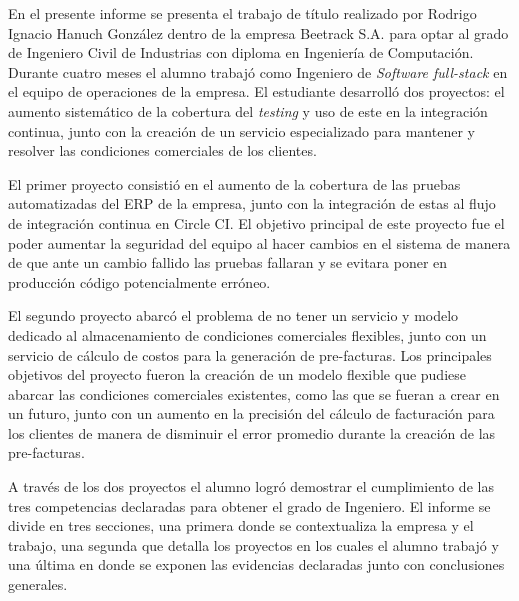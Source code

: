 En el presente informe se presenta el trabajo de título realizado por Rodrigo Ignacio Hanuch González dentro de la empresa Beetrack S.A. para optar al grado de Ingeniero Civil de Industrias con diploma en Ingeniería de Computación. Durante cuatro meses el alumno trabajó como Ingeniero de \textit{Software full-stack} en el equipo de operaciones de la empresa. El estudiante desarrolló dos proyectos: el aumento sistemático de la cobertura del \textit{testing} y uso de este en la integración continua, junto con la creación de un servicio especializado para mantener y resolver las condiciones comerciales de los clientes.

El primer proyecto consistió en el aumento de la cobertura de las pruebas automatizadas del ERP de la empresa, junto con la integración de estas al flujo de integración continua en Circle CI. El objetivo principal de este proyecto fue el poder aumentar la seguridad del equipo al hacer cambios en el sistema de manera de que ante un cambio fallido las pruebas fallaran y se evitara poner en producción código potencialmente erróneo.

El segundo proyecto abarcó el problema de no tener un servicio y modelo dedicado al almacenamiento de condiciones comerciales flexibles, junto con un servicio de cálculo de costos para la generación de pre-facturas. Los principales objetivos del proyecto fueron la creación de un modelo flexible que pudiese abarcar las condiciones comerciales existentes, como las que se fueran a crear en un futuro, junto con un aumento en la precisión del cálculo de facturación para los clientes de manera de disminuir el error promedio durante la creación de las pre-facturas.

A través de los dos proyectos el alumno logró demostrar el cumplimiento de las tres competencias declaradas para obtener el grado de Ingeniero. El informe se divide en tres secciones, una primera donde se contextualiza la empresa y el trabajo, una segunda que detalla los proyectos en los cuales el alumno trabajó y una última en donde se exponen las evidencias declaradas junto con conclusiones generales.

